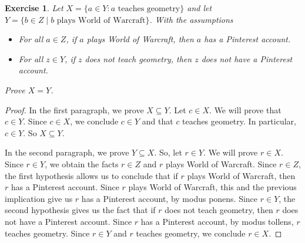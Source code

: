 \documentclass{book}
\newcounter{ekcounter}%
\theoremstyle{ekimcustom}
\newtheorem{exercise}[ekcounter]{Exercise}
\begin{document}
\begin{exercise}
Let $X = \{a \in Y : a \text{ teaches geometry}\}$ and let $Y = \{b \in Z \mid b \text{ plays World of Warcraft}\}$. With the assumptions
\begin{itemize}
\item For all $a \in Z$, if $a$ plays World of Warcraft, then $a$ has a Pinterest account.
\item For all $z \in Y$, if $z$ does not teach geometry, then $z$ does not have a Pinterest account.
\end{itemize}
Prove $X = Y$.
\end{exercise}
\begin{proof}
In the first paragraph, we prove $X \subseteq Y$. Let $c \in X$. We will prove that $c \in Y$. Since $c \in X$, we conclude $c \in Y$ and that $c$ teaches geometry. In particular, $c \in Y$. So $X \subseteq Y$.

In the second paragraph, we prove $Y \subseteq X$. So, let $r \in Y$. We will prove $r \in X$. Since $r \in Y$, we obtain the facts $r \in Z$ and $r$ plays World of Warcraft. Since $r \in Z$, the first hypothesis allows us to conclude that if $r$ plays World of Warcraft, then $r$ has a Pinterest account. Since $r$ plays World of Warcraft, this and the previous implication give us $r$ has a Pinterest account, by modus ponens. Since $r \in Y$, the second hypothesis gives us the fact that if $r$ does not teach geometry, then $r$ does not have a Pinterest account. Since $r$ has a Pinterest account, by modus tollens, $r$ teaches geometry. Since $r \in Y$ and $r$ teaches geometry, we conclude $r \in X$.
\end{proof}
\end{document}
